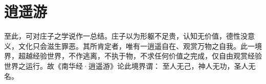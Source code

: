 \documentclass[11pt]{article}
\begin{document}
\section{逍遥游}
至此，可对庄子之学说作一总结。庄子以为形躯不足贵，认知无价值，德性没意义，文化只会滋生罪恶。其所肯定者，唯有一逍遥自在、观赏万物之自我。此一境界，超越经验世界，不作逃离，不执于物，不求任何价值之完成，仅自由观赏经验世界之运行。故《南华经·逍遥游》论此境界谓：
至人无己，神人无功，圣人无名。
  
\end{document}
